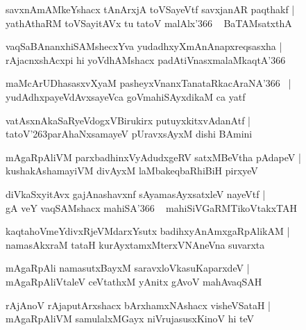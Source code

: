 \documentclass[twoside,12pt,openright]{book}
\def\S{\char'263}
\newcounter{shloka}[chapter]
\begin{document}
\begin{shloka}%
savxnAmAMkeYshacx tAnArxjA toVSayeVtf savxjanAR paqthakf |\\
yathAthaRM toVSayitAVx tu tatoV malAlx\char'366 ~ BaTAMsatxthA 
\end{shloka}

\begin{shloka}%
vaqSaBAnanxhiSAMshecxYva yudadhxyXmAnAnapxreqsasxha |\\
rAjacnxshAcxpi hi yoVdhAMshacx padAtiVnasxmalaMkaqtA\char'366
\end{shloka}

\begin{shloka}%
maMcArUDhasasxvXyaM pasheyxVnanxTanataRkacAraNA\char'366 ~|\\
yudAdhxpayeVdAvxsayeVca goVmahiSAyxdikaM ca yatf 
\end{shloka}

\begin{shloka}%
vatAsxnAkaSaRyeVdogxVBirukirx putuyxkitxvAdanAtf |\\
tatoV\S parAhaNxsamayeV pUravxsAyxM dishi BAmini
\end{shloka}

\begin{shloka}%
mAgaRpAliVM parxbadhinxVyAdudxgeRV satxMBeVtha pAdapeV |\\
kushakAshamayiVM divAyxM laMbakeqbaRhiBiH pirxyeV 
\end{shloka}

\begin{shloka}%
diVkaSxyitAvx gajAnashavxnf sAyamasAyxsatxleV nayeVtf |\\
gA veY vaqSAMshacx mahiSA\char'366 ~ mahiSiVGaRMTikoVtakxTAH 
\end{shloka}

\begin{shloka}%
kaqtahoVmeYdivxRjeVMdarxYsutx badihxyAnAmxgaRpAlikAM |\\
namasAkxraM tataH kurAyxtamxMterxVNAneVna suvarxta
\end{shloka}

\begin{shloka}%
mAgaRpAli namasutxBayxM saravxloVkasuKaparxdeV |\\
mAgaRpAliVtaleV ceVtathxM yAnitx gAvoV mahAvaqSAH 
\end{shloka}

\begin{shloka}%
rAjAnoV rAjaputArxshacx bArxhamxNAshacx visheVSataH |\\
mAgaRpAliVM samulalxMGayx niVrujasusxKinoV hi teV 
\end{shloka}
\end{document}
